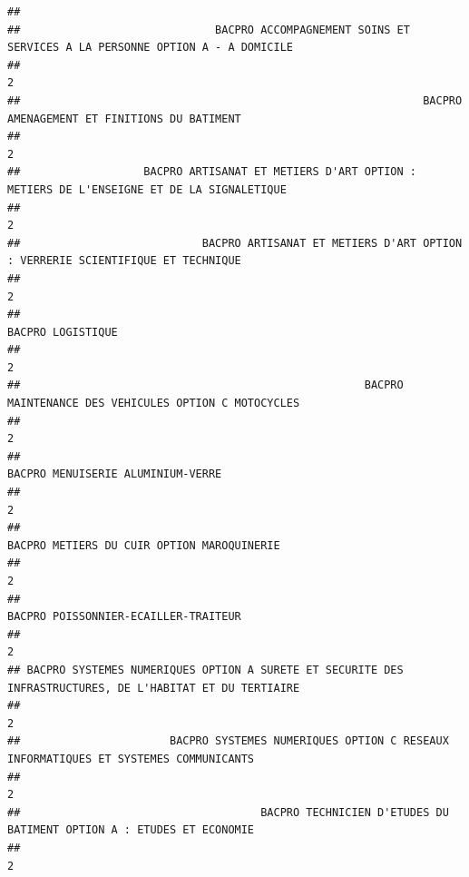 \documentclass[
]{book}
\begin{document}
\begin{verbatim}
## 
##                              BACPRO ACCOMPAGNEMENT SOINS ET SERVICES A LA PERSONNE OPTION A - A DOMICILE 
##                                                                                                        2 
##                                                              BACPRO AMENAGEMENT ET FINITIONS DU BATIMENT 
##                                                                                                        2 
##                   BACPRO ARTISANAT ET METIERS D'ART OPTION : METIERS DE L'ENSEIGNE ET DE LA SIGNALETIQUE 
##                                                                                                        2 
##                            BACPRO ARTISANAT ET METIERS D'ART OPTION : VERRERIE SCIENTIFIQUE ET TECHNIQUE 
##                                                                                                        2 
##                                                                                        BACPRO LOGISTIQUE 
##                                                                                                        2 
##                                                     BACPRO MAINTENANCE DES VEHICULES OPTION C MOTOCYCLES 
##                                                                                                        2 
##                                                                        BACPRO MENUISERIE ALUMINIUM-VERRE 
##                                                                                                        2 
##                                                               BACPRO METIERS DU CUIR OPTION MAROQUINERIE 
##                                                                                                        2 
##                                                                     BACPRO POISSONNIER-ECAILLER-TRAITEUR 
##                                                                                                        2 
## BACPRO SYSTEMES NUMERIQUES OPTION A SURETE ET SECURITE DES INFRASTRUCTURES, DE L'HABITAT ET DU TERTIAIRE 
##                                                                                                        2 
##                       BACPRO SYSTEMES NUMERIQUES OPTION C RESEAUX INFORMATIQUES ET SYSTEMES COMMUNICANTS 
##                                                                                                        2 
##                                     BACPRO TECHNICIEN D'ETUDES DU BATIMENT OPTION A : ETUDES ET ECONOMIE 
##                                                                                                        2
\end{verbatim}
\end{document}
